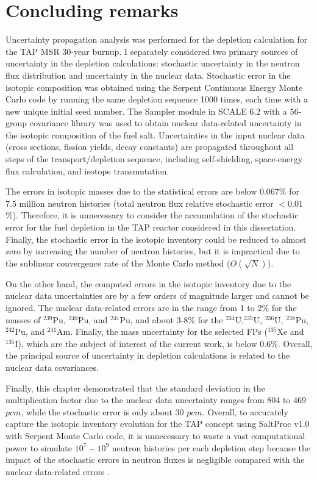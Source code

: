 \section{Concluding remarks}
Uncertainty propagation analysis was performed for the depletion calculation 
for the \gls{TAP} \gls{MSR} 30-year burnup. I separately considered two 
primary sources of uncertainty in the depletion calculations: stochastic 
uncertainty in the neutron flux distribution and uncertainty in the nuclear 
data. Stochastic error in the isotopic composition was obtained using the 
Serpent Continuous Energy Monte Carlo code by running the same depletion 
sequence 1000 times, each time with a new unique initial seed number. The 
Sampler module in SCALE 6.2 with a 56-group covariance library was used to 
obtain nuclear data-related uncertainty in the isotopic composition of the 
fuel salt. 
Uncertainties in the input nuclear data (cross sections, fission yields, decay 
constants) are propagated throughout all steps of the transport/depletion 
sequence, including self-shielding, space-energy flux calculation, and isotope 
transmutation. 

The errors in isotopic masses due to the statistical errors are below 0.067\% 
for 7.5 million neutron histories (total neutron flux relative stochastic 
error $<0.01$\%). Therefore, it is unnecessary to consider the accumulation of 
the stochastic error for the fuel depletion in the \gls{TAP} reactor 
considered in this dissertation.
Finally, the stochastic error in the isotopic inventory could be reduced to 
almost zero by increasing the number of neutron histories, but it is 
impractical due to the sublinear convergence rate of the Monte Carlo method 
($O(\sqrt{N})$).

On the other hand, the computed errors in the isotopic inventory due to the 
nuclear data uncertainties are by a few orders of magnitude larger and cannot 
be ignored. The nuclear data-related errors are in the range from 1 to 2\% for 
the masses of $^{239}$Pu, $^{240}$Pu, and $^{241}$Pu, and about 3-8\% for the 
$^{234}$U,$^{235}$U, $^{236}$U, $^{238}$Pu, $^{242}$Pu, and $^{241}$Am. 
Finally, the mass uncertainty for the selected \glspl{FP} ($^{135}$Xe and 
$^{135}$I), which are the subject of interest of the current work, is below 
0.6\%. Overall, the principal source of uncertainty in depletion calculations 
is related to the nuclear data covariances.

Finally, this chapter demonstrated that the standard deviation in the 
multiplication factor due to the nuclear data uncertainty ranges from 804 to 
469 $pcm$, while the stochastic error is only about 30 $pcm$. Overall, to 
accurately capture the isotopic inventory evolution for the \gls{TAP} concept 
using SaltProc v1.0 with Serpent Monte Carlo code, it is unnecessary to 
waste a vast computational power to simulate $10^7-10^9$ neutron histories per 
each depletion step because the impact of the stochastic errors in 
neutron fluxes is negligible compared with the nuclear data-related errors .